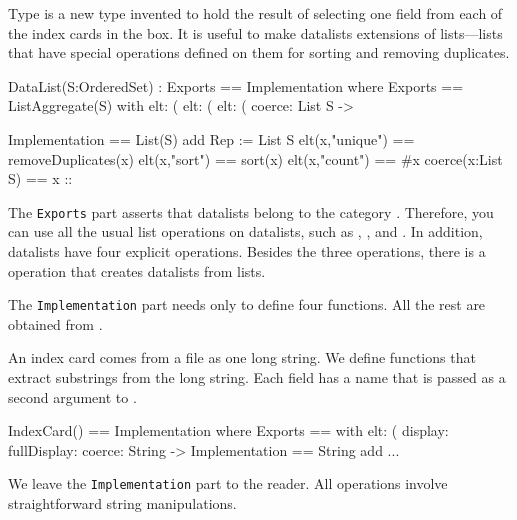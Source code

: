 {{{{{{{Type  is a new type invented to hold the result
of selecting one field from each of the index cards in the box.
It is useful to make datalists extensions of lists---lists that
have special  operations defined on them for
sorting and removing duplicates.

\begin{xmpLines}
DataList(S:OrderedSet) : Exports == Implementation where
  Exports == ListAggregate(S) with
    elt: (%
    elt: (%
    elt: (%
    coerce: List S -> %

  Implementation ==  List(S) add
    Rep := List S
    elt(x,"unique") == removeDuplicates(x)
    elt(x,"sort") == sort(x)
    elt(x,"count") == #x
    coerce(x:List S) == x :: %
\end{xmpLines}

The {\tt Exports} part asserts that datalists belong to the
category .
Therefore, you can use all the usual list operations on datalists,
such as , , and
.
In addition, datalists have four explicit operations.
Besides the three  operations, there is a
 operation that creates datalists from lists.

The {\tt Implementation} part needs only to define four functions.
All the rest are obtained from .


An index card comes from a file as one long string.
We define functions that extract substrings from the long
string.
Each field has a name that
is passed as a second argument to .

\begin{xmpLines}
IndexCard() == Implementation where
  Exports == with
    elt: (%
    display: %
    fullDisplay: %
    coerce: String -> %
  Implementation == String add ...
\end{xmpLines}

We leave the {\tt Implementation} part to the reader.
All operations involve straightforward string manipulations.


}}}}}}}
